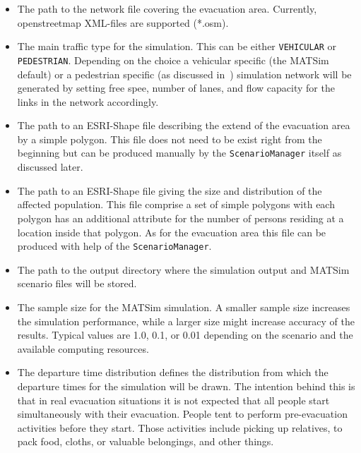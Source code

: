 \begin{itemize}
\item The path to the network file covering the evacuation area. Currently, openstreetmap XML-files are supported (*.osm).
\item The main traffic type for the simulation. This can be either \lstinline+VEHICULAR+ or \lstinline+PEDESTRIAN+. Depending on the choice a vehicular specific (the MATSim default) or a pedestrian specific (as discussed in~\citet{LaemmelKluepfelNagel2009EvacPadangAtBookTimmermanns,Laemmel_PhDThesis_2011}) simulation network will be generated by setting free spee, number of lanes, and flow capacity for the links in the network accordingly.
\item The path to an ESRI-Shape file describing the extend of the evacuation area by a simple polygon. This file does not need to be exist right from the beginning but can be produced manually by the \lstinline+ScenarioManager+ itself as discussed later.
\item The path to an ESRI-Shape file giving the size and distribution of the affected population. This file comprise a set of simple polygons with each polygon has an additional attribute for the number of persons residing at a location inside that polygon. As for the evacuation area this file can be produced with help of the  \lstinline+ScenarioManager+.
\item The path to the output directory where the simulation output and MATSim scenario files will be stored.
\item The sample size for the MATSim simulation. A smaller sample size increases the simulation performance, while a larger size might increase accuracy of the results. Typical values are 1.0, 0.1, or 0.01 depending on the scenario and the available computing resources.
\item The departure time distribution defines the distribution from which the departure times for the simulation will be drawn. The intention behind this is that in real evacuation situations it is not expected that all people start simultaneously with their evacuation. 
People tent to perform pre-evacuation activities before they start. Those activities include picking up relatives, to pack food, cloths, or valuable belongings, and other things. 

\end{itemize}
